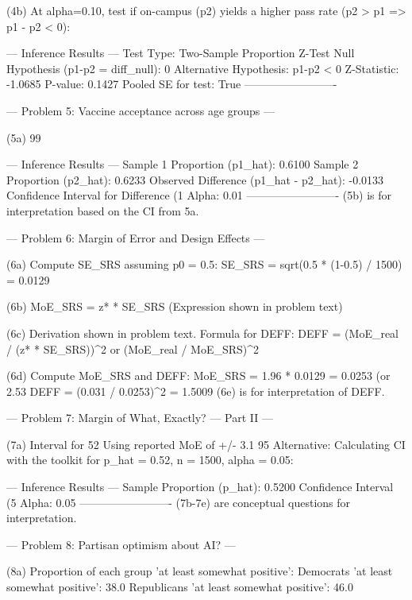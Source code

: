 (4b) At alpha=0.10, test if on-campus (p2) yields a higher pass rate (p2 > p1 => p1 - p2 < 0):

--- Inference Results ---
  Test Type: Two-Sample Proportion Z-Test
  Null Hypothesis (p1-p2 = diff_null): 0
  Alternative Hypothesis: p1-p2 < 0
  Z-Statistic: -1.0685
  P-value: 0.1427
  Pooled SE for test: True
-------------------------


--- Problem 5: Vaccine acceptance across age groups ---

(5a) 99%

--- Inference Results ---
  Sample 1 Proportion (p1_hat): 0.6100
  Sample 2 Proportion (p2_hat): 0.6233
  Observed Difference (p1_hat - p2_hat): -0.0133
  Confidence Interval for Difference (1%
  Alpha: 0.01
-------------------------
(5b) is for interpretation based on the CI from 5a.


--- Problem 6: Margin of Error and Design Effects ---

(6a) Compute SE_SRS assuming p0 = 0.5:
  SE_SRS = sqrt(0.5 * (1-0.5) / 1500) = 0.0129

(6b) MoE_SRS = z* * SE_SRS (Expression shown in problem text)

(6c) Derivation shown in problem text. Formula for DEFF: DEFF = (MoE_real / (z* * SE_SRS))^2 or (MoE_real / MoE_SRS)^2

(6d) Compute MoE_SRS and DEFF:
  MoE_SRS = 1.96 * 0.0129 = 0.0253 (or 2.53%
  DEFF = (0.031 / 0.0253)^2 = 1.5009
(6e) is for interpretation of DEFF.


--- Problem 7: Margin of What, Exactly? — Part II ---

(7a) Interval for 52%
  Using reported MoE of +/- 3.1%
  95%
  Alternative: Calculating CI with the toolkit for p_hat = 0.52, n = 1500, alpha = 0.05:

--- Inference Results ---
  Sample Proportion (p_hat): 0.5200
  Confidence Interval (5%
  Alpha: 0.05
-------------------------
(7b-7e) are conceptual questions for interpretation.


--- Problem 8: Partisan optimism about AI? ---

(8a) Proportion of each group 'at least somewhat positive':
  Democrats 'at least somewhat positive': 38.0%
  Republicans 'at least somewhat positive': 46.0%

